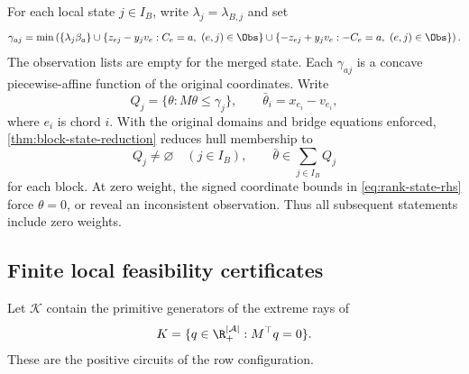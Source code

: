 For each local state $j\in I_B$, write $\lambda_j=\lambda_{B,j}$ and set
\begin{equation}\label{eq:rank-state-rhs}
 \gamma_{a j}=\min\left(
 \{\lambda_j\beta_a\}\cup
 \{z_{ej}-y_jv_e:C_e=a,\ (e,j)\in\Obs\}\cup
 \{-z_{ej}+y_jv_e:-C_e=a,\ (e,j)\in\Obs\}\right).
\end{equation}
The observation lists are empty for the merged state. Each $\gamma_{aj}$
is a concave piecewise-affine function of the original coordinates. Write
\begin{equation}\label{eq:rank-state-domains}
 Q_j=\{\theta:M\theta\le\gamma_j\},\qquad
 \bar\theta_i=x_{e_i}-v_{e_i},
\end{equation}
where $e_i$ is chord $i$. With the original domains and bridge equations
enforced, \cref{thm:block-state-reduction} reduces hull membership to
\begin{equation}\label{eq:rank-local-and-sum}
 Q_j\ne\varnothing\quad(j\in I_B),\qquad
                  \bar\theta\in\sum_{j\in I_B}Q_j
\end{equation}
for each block. At zero weight, the signed coordinate bounds in
\eqref{eq:rank-state-rhs} force $\theta=0$, or reveal an inconsistent
observation. Thus all subsequent statements include zero weights.

\subsection{Finite local feasibility certificates}\label{subsec:rank-circuits}
Let $\mathcal K$ contain the primitive generators of the extreme rays of
\begin{equation}\label{eq:rank-feasibility-cone}
 K=\{q\in\R_+^{|\mathcal A|}:M^\top q=0\}.
\end{equation}
These are the positive circuits of the row configuration.

